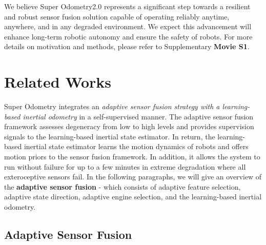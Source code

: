 We believe Super Odometry2.0 represents a significant step towards a resilient and robust sensor fusion solution capable of operating reliably anytime, anywhere, and in any degraded environment. We expect this advancement will enhance long-term robotic autonomy and ensure the safety of robots.  For more details on motivation and methods, please refer to Supplementary \textbf{Movie S1}.


\section{Related Works}
\label{chapter7:related_works}

Super Odometry integrates an \textit{adaptive sensor fusion strategy with a learning-based inertial odometry} in a self-supervised manner. The adaptive sensor fusion framework assesses degeneracy from low to high levels and provides supervision signals to the learning-based inertial state estimator. In return, the learning-based inertial state estimator learns the motion dynamics of robots and offers motion priors to the sensor fusion framework. In addition, it allows the system to run without failure for up to a few minutes in extreme degradation where all exteroceptive sensors fail.   
In the following paragraphs, we will give an overview of the \textbf{adaptive sensor fusion} - which consists of adaptive feature selection, adaptive state direction, adaptive engine selection, and the learning-based inertial odometry.  



\subsection{Adaptive Sensor Fusion}  

